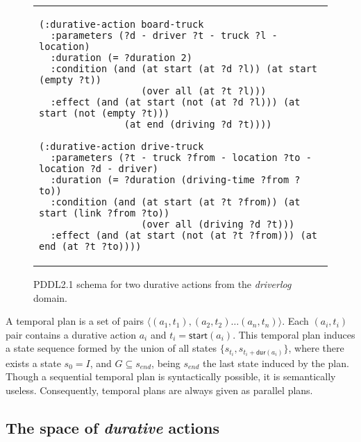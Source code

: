 \documentclass{ecai}
\newcommand{\tup}[1]{{\langle #1 \rangle}}
\newcommand{\dur}{\mathsf{dur}}    %
\newcommand{\start}{\mathsf{start}}%
\newcommand{\til}{\mathsf{til}}    %
\begin{document}
\begin{figure}
  \begin{tabular}{p{\textwidth}}
\begin{tiny}    
\begin{verbatim}
(:durative-action board-truck
  :parameters (?d - driver ?t - truck ?l - location)
  :duration (= ?duration 2)
  :condition (and (at start (at ?d ?l)) (at start (empty ?t))
                  (over all (at ?t ?l)))
  :effect (and (at start (not (at ?d ?l))) (at start (not (empty ?t)))
               (at end (driving ?d ?t))))

(:durative-action drive-truck
  :parameters (?t - truck ?from - location ?to - location ?d - driver)
  :duration (= ?duration (driving-time ?from ?to))
  :condition (and (at start (at ?t ?from)) (at start (link ?from ?to))
                  (over all (driving ?d ?t)))
  :effect (and (at start (not (at ?t ?from))) (at end (at ?t ?to))))
\end{verbatim}
\end{tiny}    
\end{tabular}
\caption{\small PDDL2.1 schema for two durative actions from the {\em driverlog} domain.}
\label{fig:exampleactions2}
\end{figure}





A temporal plan is a set of pairs $\tup{(a_1,t_1),(a_2,t_2)\ldots (a_n,t_n)}$. Each $(a_i,t_i)$ pair contains a durative action $a_i$ and $t_i=\start(a_i)$.
This temporal plan induces a state sequence formed by the union of all states $\{s_{t_i}, s_{t_i+\dur(a_i)}\}$, where there exists a state $s_{0}=I$, and $G\subseteq s_{end}$, being $s_{end}$ the last state induced by the plan.
Though a sequential temporal plan is syntactically possible, it is semantically useless. Consequently, temporal plans are always given as parallel plans.


\subsection{The space of {\em durative} actions}
\label{sec:action-space}
\end{document}
